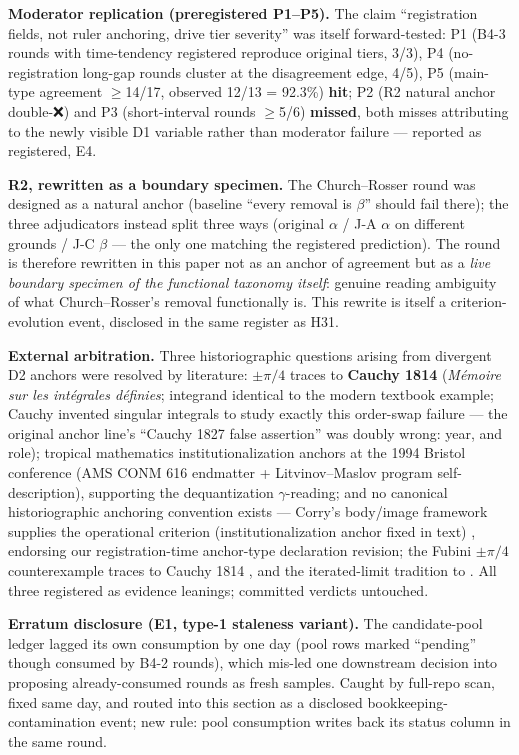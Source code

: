\textbf{Moderator replication (preregistered P1--P5).} The claim
``registration fields, not ruler anchoring, drive tier severity''
was itself forward-tested: P1 (B4-3 rounds with time-tendency
registered reproduce original tiers, 3/3), P4 (no-registration
long-gap rounds cluster at the disagreement edge, 4/5), P5
(main-type agreement $\ge$14/17, observed 12/13 = 92.3\%) \textbf{
hit}; P2 (R2 natural anchor double-❌) and P3 (short-interval rounds
$\ge$5/6) \textbf{missed}, both misses attributing to the newly
visible D1 variable rather than moderator failure --- reported as
registered, E4.

\textbf{R2, rewritten as a boundary specimen.} The Church--Rosser
round was designed as a natural anchor (baseline ``every removal is
$\beta$'' should fail there); the three adjudicators instead split
three ways (original $\alpha$ / J-A $\alpha$ on different grounds /
J-C $\beta$ --- the only one matching the registered prediction).
The round is therefore rewritten in this paper not as an anchor of
agreement but as a \emph{live boundary specimen of the functional
taxonomy itself}: genuine reading ambiguity of what
Church--Rosser's removal functionally is. This rewrite is itself a
criterion-evolution event, disclosed in the same register as H31.

\textbf{External arbitration.} Three historiographic questions
arising from divergent D2 anchors were resolved by literature:
$\pm\pi/4$ traces to \textbf{Cauchy 1814} (\emph{M\'emoire sur les
int\'egrales d\'efinies}; integrand identical to the modern textbook
example; Cauchy invented singular integrals to study exactly this
order-swap failure --- the original anchor line's ``Cauchy 1827
false assertion'' was doubly wrong: year, and role); tropical
mathematics institutionalization anchors at the 1994 Bristol
conference (AMS CONM 616 endmatter + Litvinov--Maslov program
self-description), supporting the dequantization $\gamma$-reading;
and no canonical historiographic anchoring convention exists ---
Corry's body/image framework supplies the operational criterion
(institutionalization anchor fixed in text)
\citep{corry2004modern}, endorsing our
registration-time anchor-type declaration revision; the Fubini
$\pm\pi/4$ counterexample traces to Cauchy 1814
\citep{grattan1997cauchy, gray2015real}, and the iterated-limit
tradition to \citealp{pringsheim1899doppel}. All three
registered as evidence leanings; committed verdicts untouched.

\textbf{Erratum disclosure (E1, type-1 staleness variant).} The
candidate-pool ledger lagged its own consumption by one day
(pool rows marked ``pending'' though consumed by B4-2 rounds),
which mis-led one downstream decision into proposing
already-consumed rounds as fresh samples. Caught by full-repo
scan, fixed same day, and routed into this section as a disclosed
bookkeeping-contamination event; new rule: pool consumption writes
back its status column in the same round.

